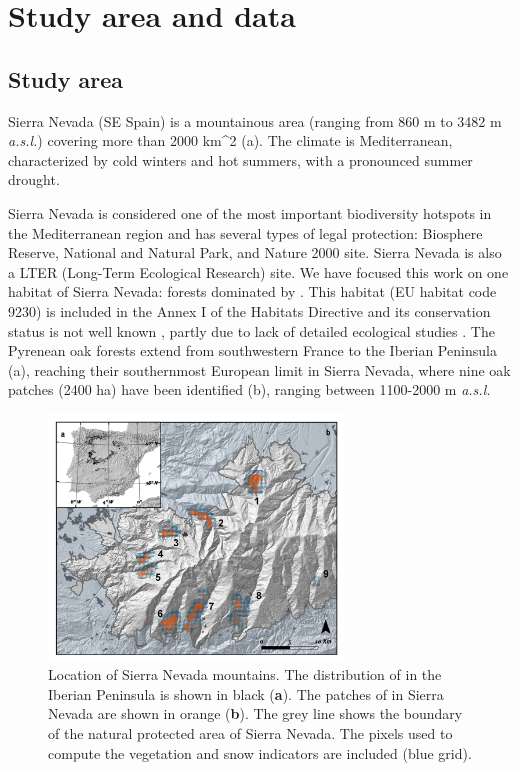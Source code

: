 \section{Study area and data}\label{sec:onto:MatMet}
\subsection{Study area}\label{sec:onto:StudyArea}

Sierra Nevada (SE Spain) is a mountainous area (ranging from 860 m to 3482 m \emph{a.s.l.}) covering more than 2000 km\^{}2 (a). The climate is Mediterranean, characterized by cold winters and hot summers, with a pronounced summer drought.

Sierra Nevada is considered one of the most important biodiversity hotspots in the Mediterranean region \autocite{Blancaetal1998ThreatenedVascular} and has several types of legal protection: Biosphere Reserve, National and Natural Park, and Nature 2000 site. Sierra Nevada is also a LTER (Long-Term Ecological Research) site.
We have focused this work on one habitat of Sierra Nevada: forests dominated by \Qpw.  This habitat (EU habitat code 9230) is included in the Annex I of the Habitats Directive and its conservation status is not well known \autocite{EIONET2013OnlineReport}, partly due to lack of detailed ecological studies \autocite{GarciaJimenez20099230Robledales}. The Pyrenean oak forests extend from southwestern France to the Iberian Peninsula \autocite{Franco1990Quercus} (a), reaching their southernmost European limit in Sierra Nevada, where nine oak patches (2400 ha) have been identified (b), ranging between 1100-2000 m \emph{a.s.l.}
\begin{figure}
    \centering
    \includegraphics[width=0.7\textwidth]{img/onto/onto-location}\caption{Location of Sierra Nevada mountains. The distribution of \Qpy in the Iberian Peninsula is shown in black (\textbf{a}). The patches of \Qpy in Sierra Nevada are shown in orange (\textbf{b}). The grey line shows the boundary of the natural protected area of Sierra Nevada. The pixels used to compute the vegetation and snow indicators are included (blue grid).}\label{fig:onto:locate}
\end{figure}

